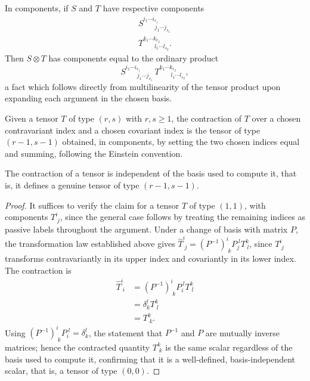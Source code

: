 In components, if $S$ and $T$ have respective components
\[
\begin{gathered}
S^{i_1\cdots i_{r_1}}_{\;\;\;\;\;\;\;j_1\cdots j_{s_1}} \\
T^{k_1\cdots k_{r_2}}_{\;\;\;\;\;\;\;l_1\cdots l_{s_2}}.
\end{gathered}
\]
Then $S \otimes T$ has components equal to the ordinary product
\[
S^{i_1\cdots i_{r_1}}_{\;\;\;\;\;\;\;j_1\cdots j_{s_1}}\, T^{k_1\cdots k_{r_2}}_{\;\;\;\;\;\;\;l_1\cdots l_{s_2}},
\]
a fact which follows directly from multilinearity of the tensor product upon expanding each argument in the chosen basis.

\begin{definition}[Contraction]
Given a tensor $T$ of type $(r,s)$ with $r,s \geq 1$, the contraction of $T$ over a chosen contravariant index and a chosen covariant index is the tensor of type $(r-1,s-1)$ obtained, in components, by setting the two chosen indices equal and summing, following the Einstein convention.
\end{definition}

\begin{theorem}
The contraction of a tensor is independent of the basis used to compute it, that is, it defines a genuine tensor of type $(r-1,s-1)$.

\end{theorem}

\begin{proof}
It suffices to verify the claim for a tensor $T$ of type $(1,1)$, with components $T^i_{\;j}$, since the general case follows by treating the remaining indices as passive labels throughout the argument. Under a change of basis with matrix $P$, the transformation law established above gives $\hat{T}^i_{\;j} = (P^{-1})^i_{\;k}P_j^{\;l}T^k_{\;l}$, since $T^i_{\;j}$ transforms contravariantly in its upper index and covariantly in its lower index. The contraction is
\[
\begin{aligned}
\hat{T}^i_{\;i} &= (P^{-1})^i_{\;k}P_i^{\;l}T^k_{\;l} \\[0.5em]
&= \delta^l_k T^k_{\;l} \\[0.5em]
&= T^k_{\;k}.
\end{aligned}
\]
Using $(P^{-1})^i_{\;k}P_i^{\;l} = \delta^l_k$, the statement that $P^{-1}$ and $P$ are mutually inverse matrices; hence the contracted quantity $T^k_{\;k}$ is the same scalar regardless of the basis used to compute it, confirming that it is a well-defined, basis-independent scalar, that is, a tensor of type $(0,0)$.

\end{proof}

